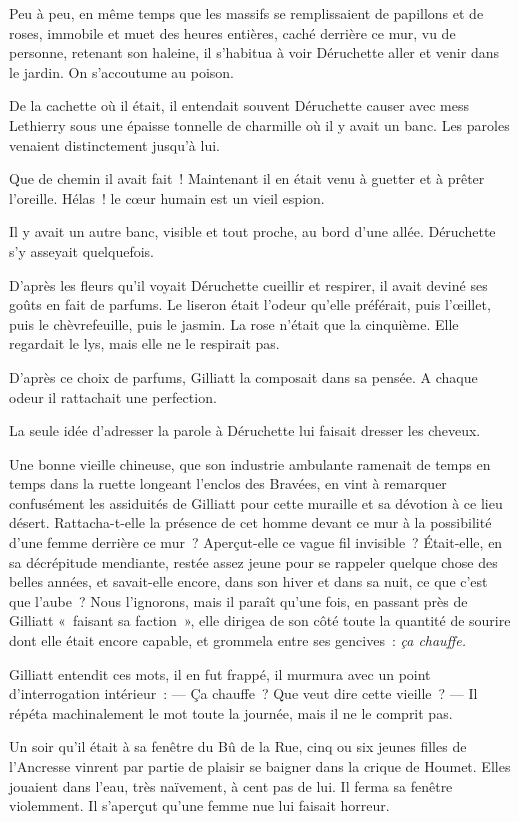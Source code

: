 \documentclass[french,twoside]{book} %
\begin{document}
Peu à peu, en même temps que les massifs se remplissaient de papillons et de roses, immobile et muet des heures entières, caché derrière ce mur, vu de personne, retenant son haleine, il s’habitua à voir Déruchette aller et venir dans le jardin. On s’accoutume au poison.\par
De la cachette où il était, il entendait souvent  Déruchette causer avec mess Lethierry sous une épaisse tonnelle de charmille où il y avait un banc. Les paroles venaient distinctement jusqu’à lui.\par
Que de chemin il avait fait ! Maintenant il en était venu à guetter et à prêter l’oreille. Hélas ! le cœur humain est un vieil espion.\par
Il y avait un autre banc, visible et tout proche, au bord d’une allée. Déruchette s’y asseyait quelquefois.\par
D’après les fleurs qu’il voyait Déruchette cueillir et respirer, il avait deviné ses goûts en fait de parfums. Le liseron était l’odeur qu’elle préférait, puis l’œillet, puis le chèvrefeuille, puis le jasmin. La rose n’était que la cinquième. Elle regardait le lys, mais elle ne le respirait pas.\par
D’après ce choix de parfums, Gilliatt la composait dans sa pensée. A chaque odeur il rattachait une perfection.\par
La seule idée d’adresser la parole à Déruchette lui faisait dresser les cheveux.\par
Une bonne vieille chineuse, que son industrie ambulante ramenait de temps en temps dans la ruette longeant l’enclos des Bravées, en vint à remarquer confusément les assiduités de Gilliatt pour cette muraille et sa dévotion à ce lieu désert. Rattacha-t-elle la présence de cet homme devant ce mur à la possibilité d’une femme derrière ce mur ? Aperçut-elle ce vague fil invisible ? Était-elle, en sa décrépitude mendiante, restée assez jeune pour se rappeler quelque chose des belles années, et savait-elle encore, dans  son hiver et dans sa nuit, ce que c’est que l’aube ? Nous l’ignorons, mais il paraît qu’une fois, en passant près de Gilliatt « faisant sa faction », elle dirigea de son côté toute la quantité de sourire dont elle était encore capable, et grommela entre ses gencives : \emph{ça chauffe.}\par
Gilliatt entendit ces mots, il en fut frappé, il murmura avec un point d’interrogation intérieur : — Ça chauffe ? Que veut dire cette vieille ? — Il répéta machinalement le mot toute la journée, mais il ne le comprit pas.\par
Un soir qu’il était à sa fenêtre du Bû de la Rue, cinq ou six jeunes filles de l’Ancresse vinrent par partie de plaisir se baigner dans la crique de Houmet. Elles jouaient dans l’eau, très naïvement, à cent pas de lui. Il ferma sa fenêtre violemment. Il s’aperçut qu’une femme nue lui faisait horreur.
\end{document}
